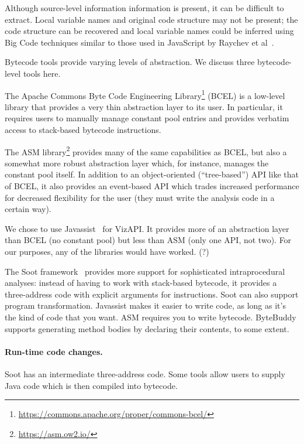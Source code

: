 Although source-level information information is present, it can be
difficult to extract. Local variable names and original code structure
may not be present; the code structure can be recovered and local
variable names could be inferred using Big Code techniques similar to
those used in JavaScript by Raychev et al~\cite{raychev2016learning}.

Bytecode tools provide varying levels of abstraction. We discuss three
bytecode-level tools here.

The Apache Commons Byte Code Engineering Library\footnote{\url{https://commons.apache.org/proper/commons-bcel/}} (BCEL) is a low-level library that
provides a very thin abstraction layer to its user. In particular,
it requires users to manually manage constant pool entries and provides
verbatim access to stack-based bytecode instructions.

The ASM library\footnote{\url{https://asm.ow2.io/}} provides many of
the same capabilities as BCEL, but also a somewhat more robust
abstraction layer which, for instance, manages the constant pool
itself. In addition to an object-oriented (``tree-based'') API like
that of BCEL, it also provides an event-based API which trades increased
performance for decreased flexibility for the user (they must write
the analysis code in a certain way).

We chose to use Javassist~\cite{chiba00:_load_struc_reflec_java}
for VizAPI. It provides more of an abstraction layer than BCEL (no
constant pool) but less than ASM (only one API, not two). For our purposes,
any of the libraries would have worked. (?)

The Soot framework~\cite{lam11:_soot_java} provides more support for
sophisticated intraprocedural analyses: instead of having to work with
stack-based bytecode, it provides a three-address code with explicit
arguments for instructions. Soot can also support program transformation.
Javassist makes it easier to write code, as long as it's the kind of
code that you want. ASM requires you to write bytecode. ByteBuddy supports
generating method bodies by declaring their contents, to some extent.

\paragraph{Run-time code changes.}



Soot has an intermediate three-address code.
Some tools allow users to supply Java code which is
then compiled into bytecode. 


